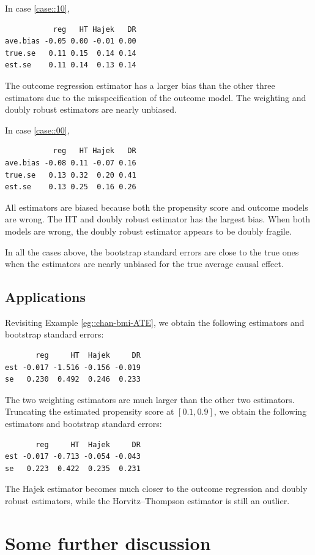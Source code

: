 In case \ref{case::10},
\begin{lstlisting}
           reg   HT Hajek   DR
ave.bias -0.05 0.00 -0.01 0.00
true.se   0.11 0.15  0.14 0.14
est.se    0.11 0.14  0.13 0.14
\end{lstlisting}
The outcome regression estimator has a larger bias than the other three estimators due to the misspecification of the outcome model. The weighting and doubly robust estimators are nearly unbiased. 


In case \ref{case::00},
\begin{lstlisting}
           reg   HT Hajek   DR
ave.bias -0.08 0.11 -0.07 0.16
true.se   0.13 0.32  0.20 0.41
est.se    0.13 0.25  0.16 0.26
\end{lstlisting}
All estimators are biased because both the propensity score and outcome models are wrong. The HT and doubly robust estimator has the largest bias. When both models are wrong, the doubly robust estimator appears to be doubly fragile. 


In all the cases above, the bootstrap standard errors are close to the true ones when the estimators are nearly unbiased for the true average causal effect. 




\subsection{Applications}
\label{sec::ATE-application}




Revisiting Example \ref{eg::chan-bmi-ATE}, we obtain the following estimators and bootstrap standard errors:
\begin{lstlisting}
       reg     HT  Hajek     DR
est -0.017 -1.516 -0.156 -0.019
se   0.230  0.492  0.246  0.233
\end{lstlisting}
The two weighting estimators are much larger than the other two estimators. Truncating the estimated propensity score at $[0.1, 0.9]$, we obtain the following estimators and bootstrap standard errors:
\begin{lstlisting}
       reg     HT  Hajek     DR
est -0.017 -0.713 -0.054 -0.043
se   0.223  0.422  0.235  0.231
\end{lstlisting}
The Hajek estimator becomes much closer to the outcome regression and doubly robust estimators, while the Horvitz--Thompson estimator is still an outlier. 



\section{Some further discussion}



